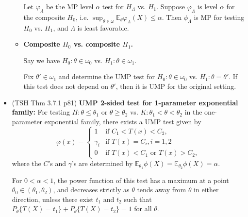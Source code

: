 \documentclass[twoside]{article}
\newcommand\bbE{\mathbb{E}}
\newcommand\Lmb{\Lambda}
\newcommand\om{\omega}
\def\t{\theta}
\begin{document}
\begin{itemize}
\begin{itemize}
Let $\varphi_\Lmb$ be the MP level $\alpha$ test for $H_\Lmb$ vs. $H_1$. Suppose $\varphi_\Lmb$ is level $\alpha$ for the composite $H_0$, i.e. $\displaystyle\sup_{\t \in \om} \bbE_\t \varphi_\Lmb (X) \leq \alpha$. Then $\phi_\Lmb$ is MP for testing $H_0$ vs. $H_1$, and $\Lmb$ is least favorable.

\item \textbf{Composite $H_0$ vs. composite $H_1$.}

Say we have $H_0: \t \in \om_0$ vs. $H_1: \t \in \om_1$.

Fix $\t' \in \om_1$ and determine the UMP test for $H_0: \t \in \om_0$ vs. $H_1: \t = \t'$. If this test does not depend on $\t'$, then it is UMP for the original setting.
\end{itemize} 

\item (TSH Thm 3.7.1 p81) \textbf{UMP 2-sided test for 1-parameter exponential family:} For testing $H: \t \leq \t_1 \text{ or } \t \geq \t_2$ vs. $K: \t_1 < \t < \t_2$ in the one-parameter exponential family, there exists a UMP test given by
\begin{equation*} \varphi(x) = \begin{cases} 1 &\text{if } C_1 < T(x) < C_2, \\ 
\gamma_i &\text{if } T(x) = C_i, i = 1,2 \\
0 &\text{if } T(x) < C_1 \text{ or } T(x) > C_2,
\end{cases}  \end{equation*}
where the $C$'s and $\gamma$'s are determined by $\bbE_{\t_1}\phi(X) = \bbE_{\t_2}\phi(X) = \alpha$.

For $0 < \alpha < 1$, the power function of this test has a maximum at a point $\t_0 \in (\t_1, \t_2)$, and decreases strictly as $\t$ tends away from $\t$ in either direction, unless there exist $t_1$ and $t_2$ such that $P_\t \{ T(X) = t_1 \} + P_\t \{ T(X) = t_2 \} = 1$ for all $\t$.

\end{itemize}
\end{document}
